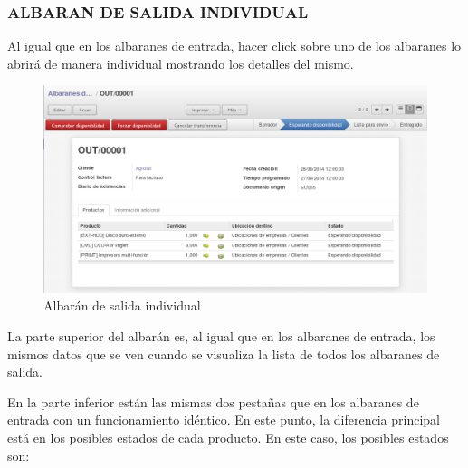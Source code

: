 \vspace{0.5cm}
\subsubsection{ALBARAN DE SALIDA INDIVIDUAL}
Al igual que en los albaranes de entrada, hacer click sobre uno de los albaranes lo abrirá de manera individual mostrando los detalles del mismo.

\begin{figure}[H]
\includegraphics[width=\textwidth]{almacen/img/alb_salida_i.png}
\caption{Albarán de salida individual}
\label{al:salidaind}
\end{figure}

La parte superior del albarán es, al igual que en los albaranes de entrada, los mismos datos que se ven cuando se visualiza la lista de todos los albaranes de salida.

En la parte inferior están las mismas dos pestañas que en los albaranes de entrada con un funcionamiento idéntico. En este punto, la diferencia principal está en los posibles estados de cada producto. En este caso, los posibles estados son:

